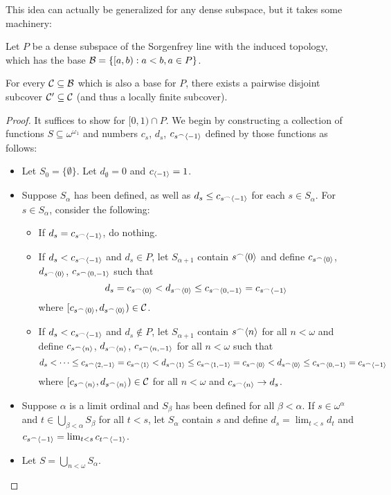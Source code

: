 This idea can actually be generalized for any dense subspace, but it takes some machinery:

\begin{theorem}
Let $P$ be a dense subspace of the Sorgenfrey line with the induced topology, which has the base $\mathcal{B} = \{[a,b) : a<b, a\in P\}$.

For every $\mathcal{C}\subseteq\mathcal{B}$ which is also a base for $P$, there exists a pairwise disjoint subcover $\mathcal{C}'\subseteq\mathcal{C}$ (and thus a locally finite subcover).
\end{theorem}
\newpage
\begin{proof}
It suffices to show for $[0,1)\cap P$. We begin by constructing a collection of functions $S\subseteq \omega^{\omega_1}$ and numbers $c_s$, $d_s$, $c_{s^\frown\langle-1\rangle}$ defined by those functions as follows:
  \begin{itemize}
    \item Let $S_0 = \{\emptyset\}$. Let $d_{\emptyset}=0$ and $c_{\langle-1\rangle}=1$.
    \item Suppose $S_\alpha$ has been defined, as well as $d_s\leq c_{s^\frown\langle-1\rangle}$ for each $s\in S_\alpha$. For $s\in S_\alpha$, consider the following:
      \begin{itemize}
        \item If $d_s = c_{s^\frown\langle-1\rangle}$, do nothing.
        \item If $d_s < c_{s^\frown\langle-1\rangle}$ and $d_s\in P$, let $S_{\alpha+1}$ contain $s^\frown\langle0\rangle$ and define $c_{s^\frown\langle0\rangle}$, $d_{s^\frown\langle0\rangle}$, $c_{s^\frown\langle0,-1\rangle}$ such that 
          \[
            d_s = c_{s^\frown\langle0\rangle} < d_{s^\frown\langle0\rangle} \leq c_{s^\frown\langle0,-1\rangle} = c_{s^\frown\langle-1\rangle}
          \]
        where $[c_{s^\frown\langle0\rangle}, d_{s^\frown\langle0\rangle})\in \mathcal{C}$.
        \item If $d_s < c_{s^\frown\langle-1\rangle}$ and $d_s\not\in P$, let $S_{\alpha+1}$ contain $s^\frown\langle n\rangle$ for all $n<\omega$ and define $c_{s^\frown\langle n\rangle}$, $d_{s^\frown\langle n\rangle}$, $c_{s^\frown\langle n,-1\rangle}$ for all $n<\omega$ such that
          \[
            d_s < \dots \leq c_{s^\frown\langle2,-1\rangle} = c_{s^\frown\langle1\rangle} < d_{s^\frown\langle1\rangle} \leq c_{s^\frown\langle1,-1\rangle} = c_{s^\frown\langle0\rangle} < d_{s^\frown\langle0\rangle} \leq c_{s^\frown\langle0,-1\rangle} = c_{s^\frown\langle-1\rangle}
          \]
        where $[c_{s^\frown\langle n\rangle}, d_{s^\frown\langle n\rangle})\in \mathcal{C}$ for all $n<\omega$ and $c_{s^\frown\langle n\rangle} \rightarrow d_s$.
      \end{itemize}
    \item Suppose $\alpha$ is a limit ordinal and $S_\beta$ has been defined for all $\beta<\alpha$. If $s\in\omega^\alpha$ and $t\in \bigcup_{\beta<\alpha}S_\beta$ for all $t<s$, let $S_\alpha$ contain $s$ and define $d_s = \lim_{t<s}d_t$ and $c_{s^\frown\langle-1\rangle} = \lim_{t<s} c_{t^\frown\langle-1\rangle}$.
      \item Let $S=\bigcup_{n<\omega} S_\alpha$.
  \end{itemize}


\end{proof}
